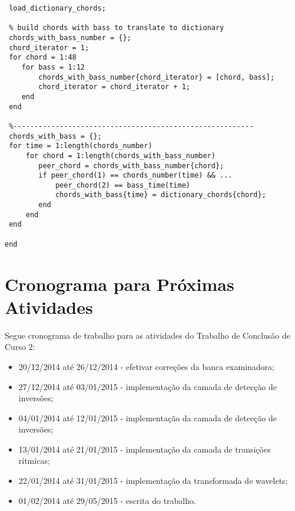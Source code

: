 \begin{apendicesenv}
\begin{lstlisting}
 load_dictionary_chords;

 % build chords with bass to translate to dictionary
 chords_with_bass_number = {};
 chord_iterator = 1;
 for chord = 1:48
    for bass = 1:12
        chords_with_bass_number{chord_iterator} = [chord, bass];
        chord_iterator = chord_iterator + 1;
    end
 end

 %---------------------------------------------------------
 chords_with_bass = {};
 for time = 1:length(chords_number)
     for chord = 1:length(chords_with_bass_number)
        peer_chord = chords_with_bass_number{chord};
        if peer_chord(1) == chords_number(time) && ... 
            peer_chord(2) == bass_time(time)
            chords_with_bass{time} = dictionary_chords{chord};
        end
     end
 end

end
\end{lstlisting}


\end{apendicesenv}

\section{Cronograma para Próximas Atividades}
\label{sec:cronograma}

Segue cronograma de trabalho para as atividades do Trabalho de Conclusão de Curso 2:
\begin{itemize}
	\item 20/12/2014 até 26/12/2014 - efetivar correções da banca examinadora;
	\item 27/12/2014 até 03/01/2015 - implementação da camada de detecção de inversões;
	\item 04/01/2014 até 12/01/2015 - implementação da camada de detecção de inversões;
	\item 13/01/2014 até 21/01/2015 - implementação da camada de transições rítmicas;
	\item 22/01/2014 até 31/01/2015 - implementação da transformada de wavelets;
	\item 01/02/2014 até 29/05/2015 - escrita do trabalho.
\end{itemize}
